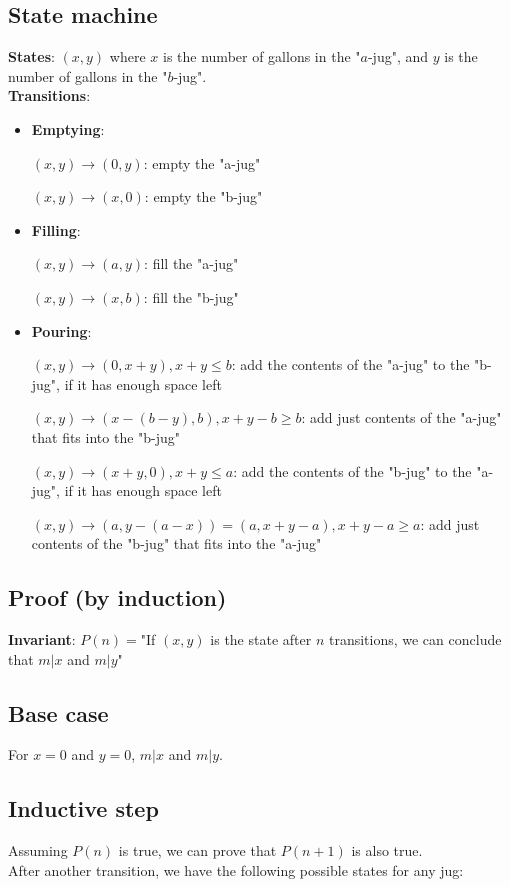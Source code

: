 \documentclass{article}
\begin{document}
	\pagebreak
	
	\subsection{State machine}
	\textbf{States}: $(x, y)$ where $x$ is the number of gallons in the "$a$-jug", and $y$ is the number of gallons in the "$b$-jug".\\
	\textbf{Transitions}:
	\begin{itemize}
		\item \textbf{Emptying}:
		
		$(x, y) \rightarrow (0, y)$:  empty the "a-jug"
		
		$(x, y) \rightarrow (x, 0)$:  empty the "b-jug"
		
		\item \textbf{Filling}:
		
		$(x, y) \rightarrow (a, y)$: fill the "a-jug"
		
		$(x, y) \rightarrow (x, b)$: fill the "b-jug"
		
		\item \textbf{Pouring}:
		
		$(x, y) \rightarrow (0, x + y), x + y \leq b$: add the contents of the "a-jug" to the "b-jug", if it has enough space left
		
		$(x, y) \rightarrow (x - (b - y), b), x + y - b \geq b$: add just contents of the "a-jug" that fits into the "b-jug"
		
		$(x, y) \rightarrow (x + y, 0), x + y \leq a$: add the contents of the "b-jug" to the "a-jug", if it has enough space left
		
		$(x, y) \rightarrow (a, y - (a - x)) = (a, x + y - a), x + y - a \geq a$: add just contents of the "b-jug" that fits into the "a-jug"
	\end{itemize}
	
	\subsection{Proof (by induction)}
	\textbf{Invariant}: $P(n) = $"If $(x, y)$ is the state after $n$ transitions, we can conclude that $m | x$ and $m | y$"
	\\
	\subsection{Base case}
	For $x = 0$ and $y = 0$, $m | x$ and $m | y $.
	
	\subsection{Inductive step}
	Assuming $P(n)$ is true, we can prove that $P(n + 1)$ is also true.\\
	After another transition, we have the following possible states for any jug:
	
\end{document}
